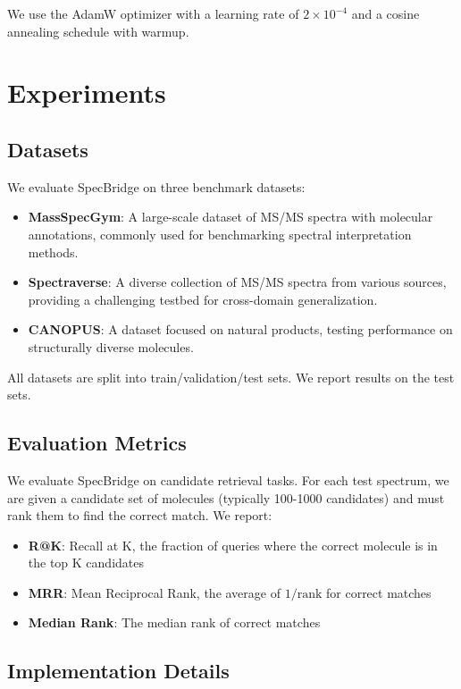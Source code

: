 \documentclass[11pt]{article}
\begin{document}
We use the AdamW optimizer with a learning rate of $2 \times 10^{-4}$ and a cosine annealing schedule with warmup.

\section{Experiments}

\subsection{Datasets}

We evaluate SpecBridge on three benchmark datasets:

\begin{itemize}
    \item \textbf{MassSpecGym}: A large-scale dataset of MS/MS spectra with molecular annotations, commonly used for benchmarking spectral interpretation methods.
    \item \textbf{Spectraverse}: A diverse collection of MS/MS spectra from various sources, providing a challenging testbed for cross-domain generalization.
    \item \textbf{CANOPUS}: A dataset focused on natural products, testing performance on structurally diverse molecules.
\end{itemize}

All datasets are split into train/validation/test sets. We report results on the test sets.

\subsection{Evaluation Metrics}

We evaluate SpecBridge on candidate retrieval tasks. For each test spectrum, we are given a candidate set of molecules (typically 100-1000 candidates) and must rank them to find the correct match. We report:

\begin{itemize}
    \item \textbf{R@K}: Recall at K, the fraction of queries where the correct molecule is in the top K candidates
    \item \textbf{MRR}: Mean Reciprocal Rank, the average of $1/\text{rank}$ for correct matches
    \item \textbf{Median Rank}: The median rank of correct matches
\end{itemize}

\subsection{Implementation Details}
\end{document}
